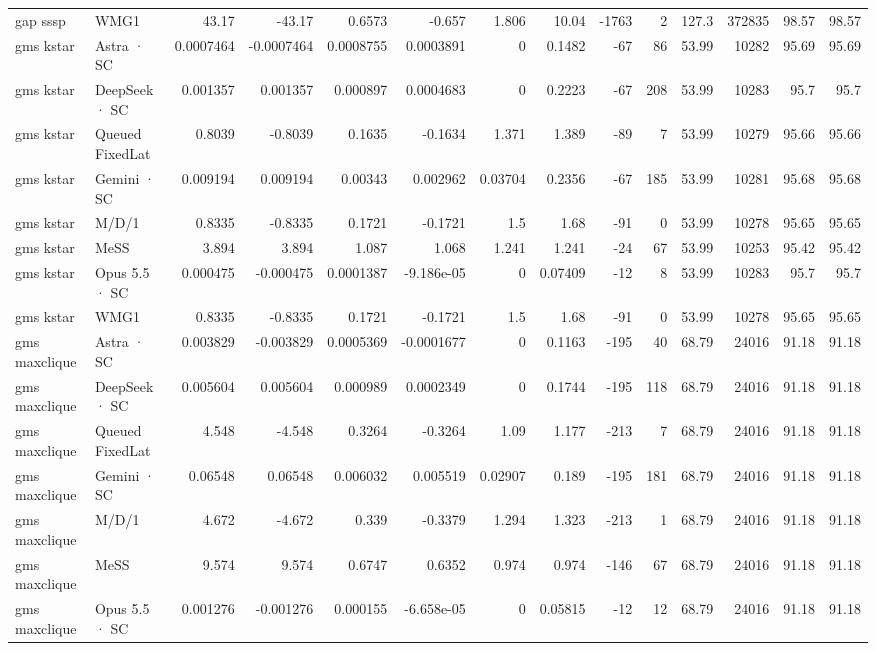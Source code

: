 \begin{tabular}{llrrrrrrrrrrrr}
gap sssp & WMG1 & 43.17 & -43.17 & 0.6573 & -0.657 & 1.806 & 10.04 & -1763 & 2 & 127.3 & 372835 & 98.57 & 98.57 \\
gms kstar & Astra · SC & 0.0007464 & -0.0007464 & 0.0008755 & 0.0003891 & 0 & 0.1482 & -67 & 86 & 53.99 & 10282 & 95.69 & 95.69 \\
gms kstar & DeepSeek · SC & 0.001357 & 0.001357 & 0.000897 & 0.0004683 & 0 & 0.2223 & -67 & 208 & 53.99 & 10283 & 95.7 & 95.7 \\
gms kstar & Queued FixedLat & 0.8039 & -0.8039 & 0.1635 & -0.1634 & 1.371 & 1.389 & -89 & 7 & 53.99 & 10279 & 95.66 & 95.66 \\
gms kstar & Gemini · SC & 0.009194 & 0.009194 & 0.00343 & 0.002962 & 0.03704 & 0.2356 & -67 & 185 & 53.99 & 10281 & 95.68 & 95.68 \\
gms kstar & M/D/1 & 0.8335 & -0.8335 & 0.1721 & -0.1721 & 1.5 & 1.68 & -91 & 0 & 53.99 & 10278 & 95.65 & 95.65 \\
gms kstar & MeSS & 3.894 & 3.894 & 1.087 & 1.068 & 1.241 & 1.241 & -24 & 67 & 53.99 & 10253 & 95.42 & 95.42 \\
gms kstar & Opus 5.5 · SC & 0.000475 & -0.000475 & 0.0001387 & -9.186e-05 & 0 & 0.07409 & -12 & 8 & 53.99 & 10283 & 95.7 & 95.7 \\
gms kstar & WMG1 & 0.8335 & -0.8335 & 0.1721 & -0.1721 & 1.5 & 1.68 & -91 & 0 & 53.99 & 10278 & 95.65 & 95.65 \\
gms maxclique & Astra · SC & 0.003829 & -0.003829 & 0.0005369 & -0.0001677 & 0 & 0.1163 & -195 & 40 & 68.79 & 24016 & 91.18 & 91.18 \\
gms maxclique & DeepSeek · SC & 0.005604 & 0.005604 & 0.000989 & 0.0002349 & 0 & 0.1744 & -195 & 118 & 68.79 & 24016 & 91.18 & 91.18 \\
gms maxclique & Queued FixedLat & 4.548 & -4.548 & 0.3264 & -0.3264 & 1.09 & 1.177 & -213 & 7 & 68.79 & 24016 & 91.18 & 91.18 \\
gms maxclique & Gemini · SC & 0.06548 & 0.06548 & 0.006032 & 0.005519 & 0.02907 & 0.189 & -195 & 181 & 68.79 & 24016 & 91.18 & 91.18 \\
gms maxclique & M/D/1 & 4.672 & -4.672 & 0.339 & -0.3379 & 1.294 & 1.323 & -213 & 1 & 68.79 & 24016 & 91.18 & 91.18 \\
gms maxclique & MeSS & 9.574 & 9.574 & 0.6747 & 0.6352 & 0.974 & 0.974 & -146 & 67 & 68.79 & 24016 & 91.18 & 91.18 \\
gms maxclique & Opus 5.5 · SC & 0.001276 & -0.001276 & 0.000155 & -6.658e-05 & 0 & 0.05815 & -12 & 12 & 68.79 & 24016 & 91.18 & 91.18 \\

\end{tabular}
